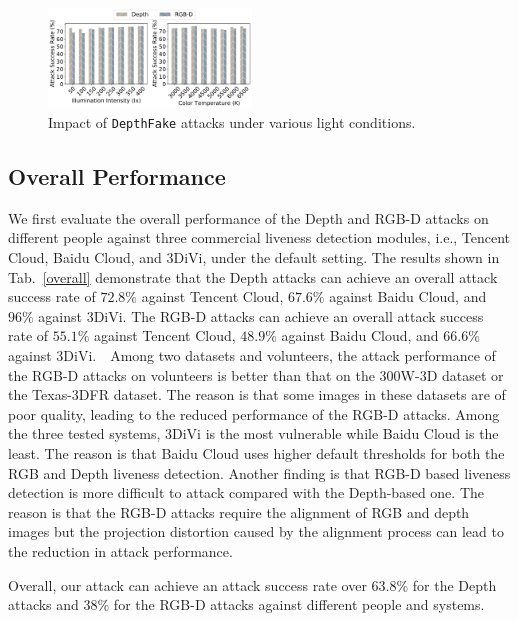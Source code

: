 \begin{figure}[pt]
	\centerline{\includegraphics[width = 0.48\textwidth]{figures/light_condition.pdf}}
	\vspace{-0.15in}
	\caption{Impact of \texttt{DepthFake} attacks under various light conditions.}
	\label{light_condition}
	\vspace{-0.1in}
\end{figure}

\subsection{Overall Performance}
We first evaluate the overall performance of the Depth and RGB-D attacks on different people against three commercial liveness detection modules, i.e., Tencent Cloud, Baidu Cloud, and 3DiVi, under the default setting. 
The results shown in Tab.~\ref{overall} demonstrate that the Depth attacks can achieve an overall attack success rate of $72.8\%$ against Tencent Cloud, $67.6\%$ against Baidu Cloud, and $96\%$ against 3DiVi. The RGB-D attacks can achieve an overall attack success rate of $55.1\%$ against Tencent Cloud, $48.9\%$ against Baidu Cloud, and $66.6\%$ against 3DiVi.  Among two datasets and volunteers, the attack performance of the RGB-D attacks on volunteers is better than that on the 300W-3D dataset or the Texas-3DFR dataset. The reason is that some images in these  datasets are of poor quality, leading to the reduced performance of the RGB-D attacks. 
Among the three tested systems, 3DiVi is the most vulnerable while Baidu Cloud is the least. The reason is that Baidu Cloud uses higher default thresholds for both the RGB and Depth liveness detection. 
Another finding is that RGB-D based liveness detection is more difficult to attack compared with the Depth-based one. The reason is that the RGB-D attacks require the alignment of RGB and depth images but the projection distortion caused by the alignment process can lead to the reduction in attack performance.

Overall, our attack can achieve an attack success rate  over $63.8\%$ for the Depth attacks and $38\%$ for the RGB-D attacks against different people and systems.

